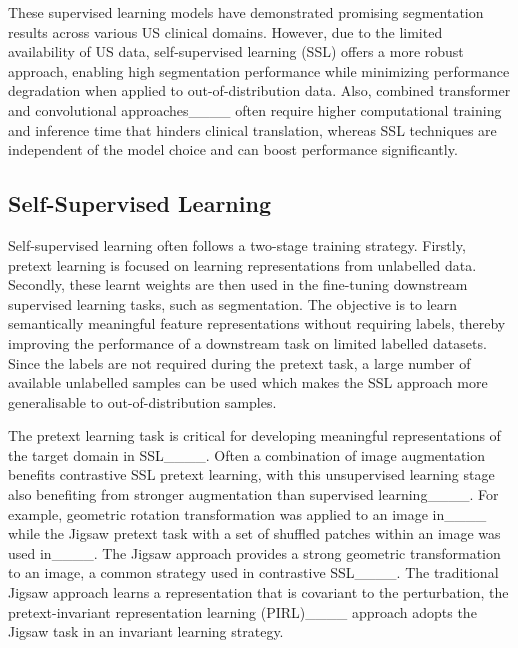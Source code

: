 %
These supervised learning models have demonstrated promising segmentation results across various US clinical domains. However, due to the limited availability of US data, self-supervised learning (SSL) offers a more robust approach, enabling high segmentation performance while minimizing performance degradation when applied to out-of-distribution data. Also, combined transformer and convolutional approaches____  often require higher computational training and inference time that hinders clinical translation, whereas SSL techniques are independent of the model choice and can boost performance significantly.

\subsection{Self-Supervised Learning}
Self-supervised learning often follows a two-stage training strategy. Firstly, pretext learning is focused on learning representations from unlabelled data. Secondly, these learnt weights are then used in the fine-tuning downstream supervised learning tasks, such as segmentation. The objective is to learn semantically meaningful feature representations without requiring labels, thereby improving the performance of a downstream task on limited labelled datasets. Since the labels are not required during the pretext task, a large number of available unlabelled samples can be used which makes the SSL approach more generalisable to out-of-distribution samples. 

The pretext learning task is critical for developing meaningful representations of the target domain in SSL____. Often a combination of image augmentation benefits contrastive SSL pretext learning, with this unsupervised learning stage also benefiting from stronger augmentation than supervised learning____. For example, geometric rotation transformation was applied to an image in____ while the Jigsaw pretext task with a set of shuffled patches within an image was used in____. The Jigsaw approach provides a strong geometric transformation to an image, a common strategy used in contrastive SSL____. The traditional Jigsaw approach learns a representation that is covariant to the perturbation, the pretext-invariant representation learning (PIRL)____ approach adopts the Jigsaw task in an invariant learning strategy. 

